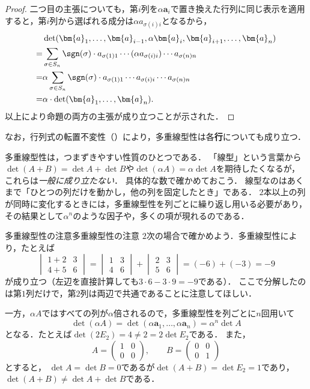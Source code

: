 \begin{tleftbar}
\begin{proof}
  二つ目の主張についても，第$i$列を$\alpha\bm{a}_i$で置き換えた行列に同じ表示を適用すると，第$i$列から選ばれる成分は$\alpha a_{\sigma(i)i}$となるから，
  \begin{align*} 
    &\det(\bm{a}_1, \dots, \bm{a}_{i-1}, \alpha \bm{a}_i, \bm{a}_{i+1}, \dots, \bm{a}_n) \\
    =& \sum_{\sigma \in S_n} \sgn(\sigma) \cdot a_{\sigma(1)1} \dotsm (\alpha a_{\sigma(i)i}) \dotsm a_{\sigma(n)n} \\
    =& \alpha \sum_{\sigma \in S_n} \sgn(\sigma) \cdot a_{\sigma(1)1} \dotsm a_{\sigma(i)i} \dotsm a_{\sigma(n)n} \\
    =& \alpha \cdot \det(\bm{a}_1, \dots, \bm{a}_n).
  \end{align*}
  以上により命題の両方の主張が成り立つことが示された．
\end{proof}
\end{tleftbar}

なお，行列式の転置不変性（）により，多重線型性は各\textbf{行}についても成り立つ．

多重線型性は，つまずきやすい性質のひとつである．
「線型」という言葉から$\det(A + B) = \det A + \det B$や$\det(\alpha A) = \alpha \det A$を期待したくなるが，これらは\emph{一般に成り立たない}．
具体的な数で確かめておこう．
線型なのはあくまで「ひとつの列だけを動かし，他の列を固定したとき」である．
$2$本以上の列が同時に変化するときには，多重線型性を列ごとに繰り返し用いる必要があり，その結果として$\alpha^n$のような因子や，多くの項が現れるのである．

\begin{example}{多重線型性の注意}{多重線型性の注意}
  $2$次の場合で確かめよう．多重線型性により，たとえば
  \[
    \begin{vmatrix} 1 + 2 & 3 \\ 4 + 5 & 6 \end{vmatrix}
    = \begin{vmatrix} 1 & 3 \\ 4 & 6 \end{vmatrix} + \begin{vmatrix} 2 & 3 \\ 5 & 6 \end{vmatrix}
    = (-6) + (-3) = -9
  \]
  が成り立つ（左辺を直接計算しても$3 \cdot 6 - 3 \cdot 9 = -9$である）．
  ここで分解したのは第$1$列だけで，第$2$列は両辺で共通であることに注意してほしい．

  一方，$\alpha A$ではすべての列が$\alpha$倍されるので，多重線型性を列ごとに$n$回用いて
  \[
    \det(\alpha A) = \det(\alpha\bm{a}_1, \dots, \alpha\bm{a}_n) = \alpha^n \det A
  \]
  となる．たとえば$\det(2E_2) = 4 \ne 2 = 2\det E_2$である．
  また，
  \[
    A = \begin{pmatrix} 1 & 0 \\ 0 & 0 \end{pmatrix}, \qquad
    B = \begin{pmatrix} 0 & 0 \\ 0 & 1 \end{pmatrix}
  \]
  とすると，
  $\det A = \det B = 0$であるが$\det(A + B) = \det E_2 = 1$であり，$\det(A + B) \ne \det A + \det B$である．
\end{example}

